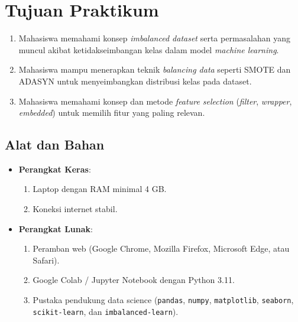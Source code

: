 \documentclass[a4paper,oneside,12pt]{report}
\begin{document}
\tableofcontents
\clearpage

\setcounter{page}{3}

\chapter[Tujuan Praktikum]{Tujuan Praktikum}

\begin{enumerate}
    \item Mahasiswa memahami konsep \textit{imbalanced dataset} serta permasalahan yang muncul akibat ketidakseimbangan kelas dalam model \textit{machine learning}.
    \item Mahasiswa mampu menerapkan teknik \textit{balancing data} seperti SMOTE dan ADASYN untuk menyeimbangkan distribusi kelas pada dataset.
    \item Mahasiswa memahami konsep dan metode \textit{feature selection} (\textit{filter}, \textit{wrapper}, \textit{embedded}) untuk memilih fitur yang paling relevan.
\end{enumerate}

\section*{Alat dan Bahan}
\begin{itemize}
    \item \textbf{Perangkat Keras}:
    \begin{enumerate}
        \item Laptop dengan RAM minimal 4 GB.
        \item Koneksi internet stabil.
    \end{enumerate}
    \item \textbf{Perangkat Lunak}:
    \begin{enumerate}
        \item Peramban web (Google Chrome, Mozilla Firefox, Microsoft Edge, atau Safari).
        \item Google Colab / Jupyter Notebook dengan Python 3.11.
        \item Pustaka pendukung data science (\texttt{pandas}, \texttt{numpy}, \texttt{matplotlib}, \texttt{seaborn}, \texttt{scikit-learn}, dan \texttt{imbalanced-learn}).
    \end{enumerate}
\end{itemize}
\end{document}
